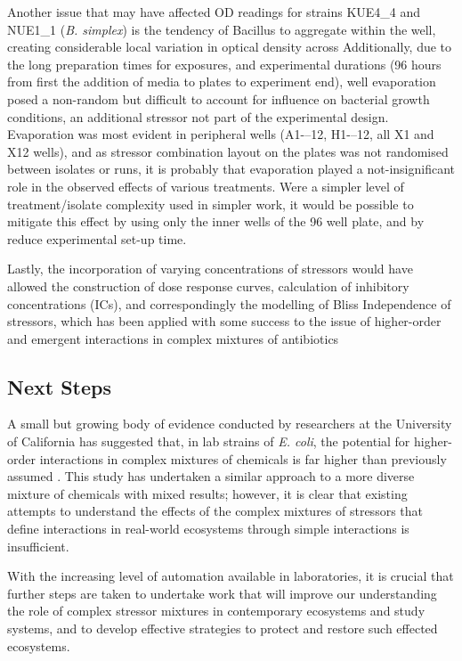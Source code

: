 \documentclass[review,12pt]{elsarticle}
\begin{document}
Another issue that may have affected OD readings for strains KUE4\_4 and NUE1\_1 (\textit{B. simplex}) is the tendency of Bacillus to aggregate within the well, creating considerable local variation in optical density across 
Additionally, due to the long preparation times for exposures, and experimental durations (96 hours from first the addition of media to plates to experiment end), well evaporation posed a non-random but difficult to account for influence on bacterial growth conditions, an additional stressor not part of the experimental design. Evaporation was most evident in peripheral wells (A1-–12, H1-–12, all X1 and X12 wells), and as stressor combination layout on the plates was not randomised between isolates or runs, it is probably that evaporation played a not-insignificant role in the observed effects of various treatments. Were a simpler level of treatment/isolate complexity used in simpler work, it would be possible to mitigate this effect by using only the inner wells of the 96 well plate, and by reduce experimental set-up time. 

Lastly, the incorporation of varying concentrations of stressors would have allowed the construction of dose response curves, calculation of inhibitory concentrations (ICs), and correspondingly the modelling of Bliss Independence \cite{Bliss1939} of stressors, which has been applied with some success to the issue of higher-order and emergent interactions in complex mixtures of antibiotics \cite{Beppler2016UncoveringStressors,Tekin2017PrevalenceInteractions} 
\subsection{Next Steps}
\label{S:4:4}

A small but growing body of evidence conducted by researchers at the University of California has suggested that, in lab strains of \textit{E. coli}, the potential for higher-order interactions in complex mixtures of chemicals is far higher than previously assumed \cite{Beppler2016UncoveringStressors,Tekin2016,Tekin2017PrevalenceInteractions}.  This study has undertaken a similar approach to a more diverse mixture of chemicals with mixed results; however, it is clear that existing attempts to understand the effects of the complex mixtures of stressors that define interactions in real-world ecosystems through simple interactions is insufficient.

With the increasing level of automation available in laboratories, it is crucial that further steps are taken to undertake work that will improve our understanding the role of complex stressor mixtures in contemporary ecosystems and study systems, and to develop effective strategies to protect and restore such effected ecosystems.
\end{document}
